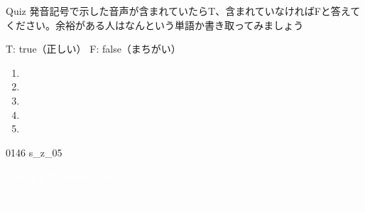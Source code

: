\documentclass[aspectratio=169, xcolor={dvipsnames,table}]{beamer}
\begin{document}
\begin{frame}[plain]{Quiz }
  発音記号で示した音声が含まれていたらT、含まれていなければFと答えてください。余裕がある人はなんという単語か書き取ってみましょう

  \hfill{}{\scriptsize T: true（正しい）\hspace{5pt} F: false（まちがい）}

  \Large

  \begin{enumerate}
    \item \mbox{}\hspace{1\zw}

    \item \mbox{}\hspace{1\zw}

    \item \mbox{}\hspace{1\zw}

    \item \mbox{}\hspace{1\zw}

    \item \mbox{}\hspace{1\zw}
  \end{enumerate}

  \hfill{\tiny 0146}\,{\scriptsize {}}\,{\tiny s\_z\_05}
\end{frame}
\begin{frame}
  \centering
  \textcolor{white}{\Huge\bfseries Today's Pronunciation}

  \vspace{30pt}

  \textcolor{white}{\Huge\bfseries {}, }
\end{frame}
\end{document}
